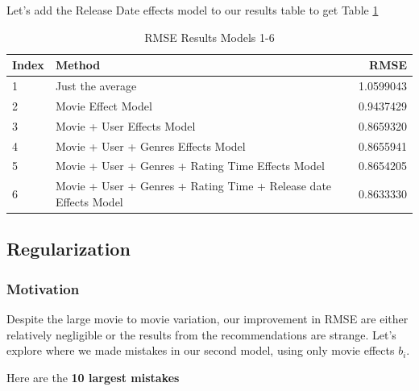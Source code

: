 \documentclass[
]{article}
\begin{document}
Let's add the Release Date effects model to our results table to get
Table \ref{tbl:rmse_results_model_1-6}

\begin{table}[H]

\caption{\label{tab:rde_5}RMSE Results Models 1-6\label{tbl:rmse_results_model_1-6}}
\centering
\fontsize{7}{9}\selectfont
\begin{tabular}[t]{llr}
\toprule
Index & Method & RMSE\\
\midrule
1 & Just the average & 1.0599043\\
2 & Movie Effect Model & 0.9437429\\
3 & Movie + User Effects Model & 0.8659320\\
4 & Movie + User + Genres Effects Model & 0.8655941\\
5 & Movie + User + Genres + Rating Time Effects Model & 0.8654205\\
6 & Movie + User + Genres + Rating Time + Release date Effects Model & 0.8633330\\
\bottomrule
\end{tabular}
\end{table}

\newpage

\hypertarget{regularization}{%
\subsection{Regularization}\label{regularization}}

\hypertarget{motivation}{%
\subsubsection{Motivation}\label{motivation}}

Despite the large movie to movie variation, our improvement in RMSE are
either relatively negligible or the results from the recommendations are
strange. Let's explore where we made mistakes in our second model, using
only movie effects \(b_{i}\).

Here are the \textbf{10 largest mistakes}
\end{document}
